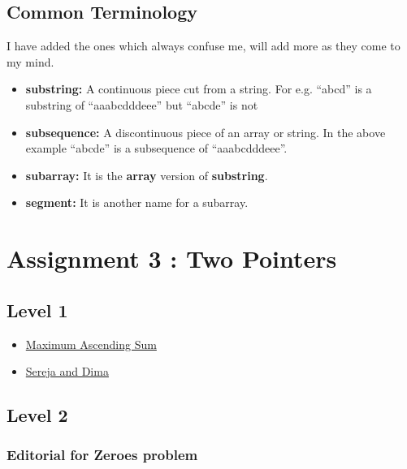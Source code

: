 \documentclass[13pt,oneside,a4paper]{book}
\begin{document}
\section{Common Terminology}

I have added the ones which always confuse me, will add more as
they come to my mind.

\begin{itemize}
        \item \textbf{substring:} A continuous piece cut from a string. For e.g. ``abcd'' is a substring of ``aaabcdddeee'' but ``abcde'' is not
        \item \textbf{subsequence:} A discontinuous piece of an array or string. In the above example ``abcde'' is a subsequence of ``aaabcdddeee''.
        \item \textbf{subarray:} It is the \textbf{array} version of \textbf{substring}.
        \item \textbf{segment:} It is another name for a subarray.
\end{itemize}

\chapter{Assignment 3 : Two Pointers}

\section{Level 1}

\begin{itemize}
        \item \href{https://leetcode.com/problems/maximum-ascending-subarray-sum/}{Maximum Ascending Sum}
        \item \href{https://codeforces.com/problemset/problem/381/A}{Sereja and Dima}
\end{itemize}

\section{Level 2}

\subsection{Editorial for Zeroes problem}
\end{document}
